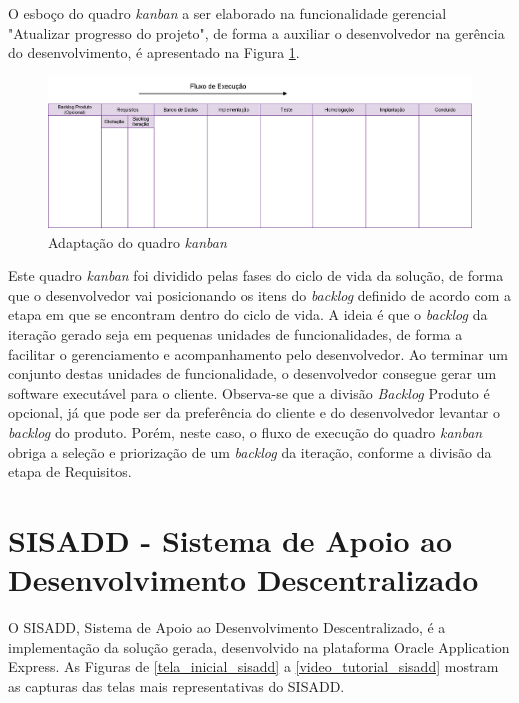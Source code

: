 O esboço do quadro \textit{kanban} a ser elaborado na funcionalidade gerencial "Atualizar progresso do projeto", de forma a auxiliar o desenvolvedor na gerência do desenvolvimento, é apresentado na Figura \ref{kanban_criado}. \clearpage


\begin{landscape}
\vspace*{3cm}
\begin{figure}[!htb]
	\centering
		\includegraphics[scale=0.35]{figuras/kanban}
	\caption{Adaptação do quadro \textit{kanban}}
	\label{kanban_criado}
\end{figure}
\end{landscape}

Este quadro \textit{kanban} foi dividido pelas fases do ciclo de vida da solução, de forma que o desenvolvedor vai posicionando os itens do \textit{backlog} definido de acordo com a etapa em que se encontram dentro do ciclo de vida. A ideia é que o \textit{backlog} da iteração gerado seja em pequenas unidades de funcionalidades, de forma a facilitar o gerenciamento e acompanhamento pelo desenvolvedor. Ao terminar um conjunto destas unidades de funcionalidade, o desenvolvedor consegue gerar um software executável para o cliente. Observa-se que a divisão \textit{Backlog} Produto é opcional, já que pode ser da preferência do cliente e do desenvolvedor levantar o \textit{backlog} do produto. Porém, neste caso, o fluxo de execução do quadro \textit{kanban} obriga a seleção e priorização de um \textit{backlog} da iteração, conforme a divisão da etapa de Requisitos.

\section{SISADD - Sistema de Apoio ao Desenvolvimento Descentralizado}

O SISADD, Sistema de Apoio ao Desenvolvimento Descentralizado, é a implementação da solução gerada, desenvolvido na plataforma Oracle Application Express. As Figuras de \ref{tela_inicial_sisadd} a \ref{video_tutorial_sisadd} mostram as capturas das telas mais representativas do SISADD.

